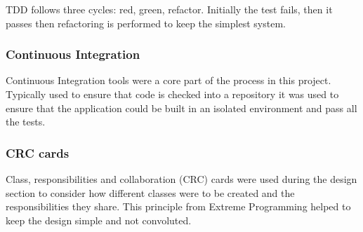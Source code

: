 TDD follows three cycles: red, green, refactor. Initially the test fails, then it passes then refactoring is performed to keep the simplest system.

\subsubsection{Continuous Integration}
Continuous Integration tools were a core part of the process in this project. Typically used to ensure that code is checked into a repository it was used to ensure that the application could be built in an isolated environment and pass all the tests.

\subsubsection{CRC cards}
Class, responsibilities and collaboration (CRC) cards \cite{citeulike:13398676} were used during the design section to consider how different classes were to be created and the responsibilities they share. This principle from Extreme Programming helped to keep the design simple and not convoluted.

